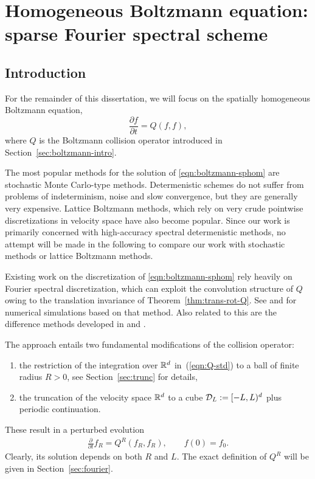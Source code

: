 \chapter{Homogeneous Boltzmann equation: sparse Fourier spectral scheme}
\label{chap:boltzmann-fourier}

\section{Introduction} 
\label{sect:boltzmann}

For the remainder of this dissertation, we will focus on the spatially homogeneous Boltzmann equation,
\begin{equation} \label{eqn:boltzmann-sphom}
    \frac{\partial f}{\partial t} = Q(f,f),
\end{equation}
where $Q$ is the Boltzmann collision operator introduced in Section~\ref{sec:boltzmann-intro}.

The most popular methods for the solution of \eqref{eqn:boltzmann-sphom} are stochastic Monte Carlo-type
methods. Determenistic schemes do not suffer from problems of indeterminism, noise and slow convergence, but
they are generally very expensive. Lattice Boltzmann methods, which rely on very crude pointwise
discretizations in velocity space have also become popular. Since our work is primarily concerned with
high-accuracy spectral determenistic methods, no attempt will be made in the following to compare our work
with stochastic methods or lattice Boltzmann methods.

Existing work on the discretization of \eqref{eqn:boltzmann-sphom} rely heavily on Fourier spectral
discretization, which can exploit the convolution structure of $Q$ owing to the translation invariance of
Theorem~\ref{thm:trans-rot-Q}. See
\cite{Bobylev1988tns, Kirsch2007wfb, Pareschi1996fsm} and
\cite{Gamba2009slm, Gamba2010sbs, Filbet2006sbe, Pareschi2000nsb, Pareschi2003smb}
for numerical simulations based on that method. Also related to this are the
difference methods developed in
\cite{Bobylev1997dsb, Bobylev1999fdm, Bobylev2000nsb} and \cite{Ibragimov2002nsb}.

The approach entails two fundamental modifications of the collision operator:
\begin{enumerate}
  \renewcommand{\labelenumi}{(\roman{enumi})}
  \item the restriction of the integration over $\mathbb{R}^{d}$ in~(\ref{eqn:Q-std}) to 
    a ball of finite radius $R>0$, see Section~\ref{sec:trunc} for details, 
  \item the truncation of the velocity space $\mathbb{R}^{d}$ to a cube $\mathcal{D}_{L} := [-L,L)^{d}$ plus
    periodic continuation. 
\end{enumerate}
These result in a perturbed evolution
\begin{gather}
  \label{eqn:QR}
  \frac{\partial}{\partial t}{f}_R = Q^R(f_R, f_R), \qquad f(0) = f_0.
\end{gather}
Clearly, its solution depends on both $R$ and $L$. The exact definition of $Q^R$ will be given in
Section~\ref{sec:fourier}.

